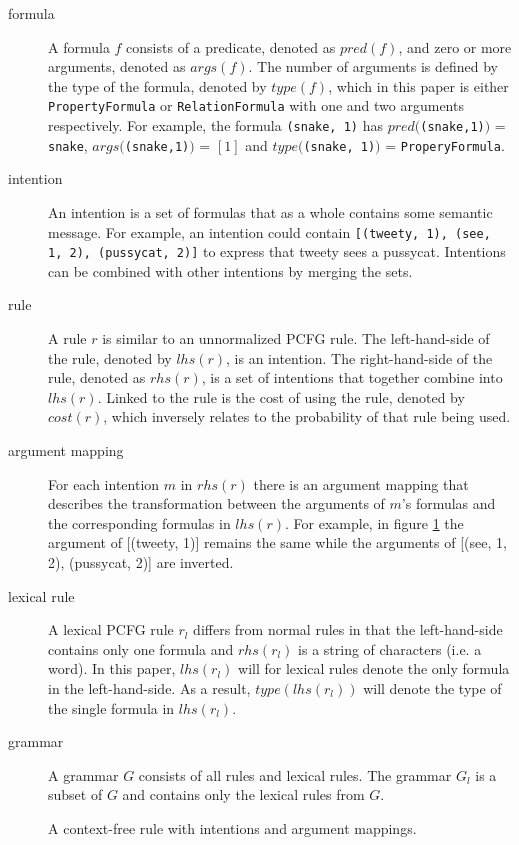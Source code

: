 \documentclass[a4paper]{article}
\begin{document}
\begin{description}
    \item[formula] A formula $f$ consists of a predicate, denoted as $pred(f)$, and zero or more arguments, denoted as $args(f)$. The number of arguments is defined by the type of the formula, denoted by $type(f)$, which in this paper is either \verb|PropertyFormula| or \verb|RelationFormula| with one and two arguments respectively. For example, the formula \verb|(snake, 1)| has $pred($\verb|(snake,1)|$)$ = \verb|snake|, $args($\verb|(snake,1)|$)$ = $[1]$ and $type($\verb|(snake, 1)|$)$ = \verb|ProperyFormula|.
    \item[intention] An intention is a set of formulas that as a whole contains some semantic message. For example, an intention could contain \verb|[(tweety, 1), (see, 1, 2), (pussycat, 2)]| to express that tweety sees a pussycat. Intentions can be combined with other intentions by merging the sets.
    \item[rule] A rule $r$ is similar to an unnormalized PCFG rule. The left-hand-side of the rule, denoted by $lhs(r)$, is an intention. The right-hand-side of the rule, denoted as $rhs(r)$, is a set of intentions that together combine into $lhs(r)$. Linked to the rule is the cost of using the rule, denoted by $cost(r)$, which inversely relates to the probability of that rule being used.
    \item[argument mapping] For each intention $m$ in $rhs(r)$ there is an argument mapping that describes the transformation between the arguments of $m$'s formulas and the corresponding formulas in $lhs(r)$. For example, in figure \ref{fig:rule} the argument of [(tweety, 1)] remains the same while the arguments of [(see, 1, 2),  (pussycat, 2)] are inverted.
    \item[lexical rule] A lexical PCFG rule $r_l$ differs from normal rules in that the left-hand-side contains only one formula and $rhs(r_l)$ is a string of characters (i.e. a word). In this paper, $lhs(r_l)$ will for lexical rules denote the only formula in the left-hand-side. As a result, $type(lhs(r_l))$ will denote the type of the single formula in $lhs(r_l)$.
    \item[grammar] A grammar $G$ consists of all rules and lexical rules. The grammar $G_l$ is a subset of $G$ and contains only the lexical rules from $G$.
\end{description}

\begin{figure}[h!]
\centering
{}
\caption{A context-free rule with intentions and argument mappings.}
\label{fig:rule}
\end{figure}
\end{document}
